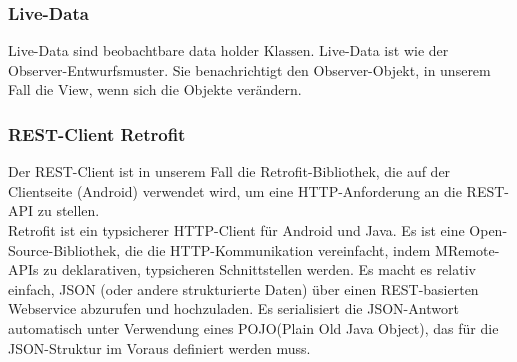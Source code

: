 \subsubsection{Live-Data}
Live-Data sind beobachtbare data holder Klassen. Live-Data ist wie der Observer-Entwurfsmuster. Sie benachrichtigt den Observer-Objekt, in unserem Fall die View, wenn sich die Objekte verändern. 

\subsubsection{REST-Client Retrofit}

Der REST-Client ist in unserem Fall die Retrofit-Bibliothek, die auf der Clientseite (Android) verwendet wird, um eine HTTP-Anforderung an die REST-API zu stellen.\\
Retrofit ist ein typsicherer HTTP-Client für Android und Java. Es ist eine Open-Source-Bibliothek, die die HTTP-Kommunikation vereinfacht, indem MRemote-APIs zu deklarativen, typsicheren Schnittstellen werden. Es macht es relativ einfach, JSON (oder andere strukturierte Daten) über einen REST-basierten Webservice abzurufen und hochzuladen. Es serialisiert die JSON-Antwort automatisch unter Verwendung eines POJO(Plain Old Java Object), das für die JSON-Struktur im Voraus definiert werden muss.